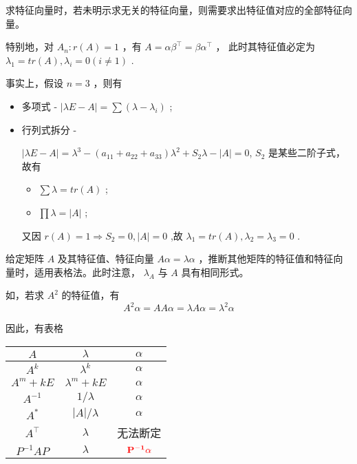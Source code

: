 求特征向量时，若未明示求无关的特征向量，则需要求出特征值对应的全部特征向量。


特别地，对 $ A_n:r(A) = 1 $ ，有 $ A = \alpha\beta^\top = \beta\alpha^\top $ ，
此时其特征值必定为 $ \lambda_1 = tr(A),\lambda_i = 0(i\neq 1) $ .

事实上，假设 $ n = 3 $ ，则有
\begin{itemize}
    \item 多项式 - $ |\lambda E - A | = \sum (\lambda - \lambda_i) $ ;
    \item 行列式拆分 - 
    
    $ |\lambda E - A| = \lambda^3 - (a_{11}+a_{22}+a_{33})\lambda^2 + S_2\lambda - |A| = 0 $,
    $ S_2 $ 是某些二阶子式，
    故有
    \begin{itemize}
        \item $ \sum \lambda = tr(A) $ ;
        \item $ \prod \lambda = |A| $ ;
    \end{itemize}
    又因 $ r(A) = 1 \Rightarrow S_2 = 0, |A| = 0 $ ,故 $ \lambda_1 = tr(A), \lambda_2 = \lambda_3 = 0$ .
\end{itemize} 


给定矩阵 $ A $ 及其特征值、特征向量 $ A\alpha = \lambda\alpha $ ，推断其他矩阵的特征值和特征向量时，适用表格法。此时注意，
$ \lambda_A $ 与 $ A $ 具有相同形式。

如，若求 $ A^2 $ 的特征值，有
$$
    A^2\alpha = AA\alpha = \lambda A\alpha = \lambda^2\alpha
$$ 

因此，有表格

\begin{table}[!htbp]\centering
    \begin{tabular}{ccc}
    \toprule
    $A        $&$ \lambda      $& $\alpha                  $ \\ \midrule
    $A^k      $&$ \lambda^k    $& $\alpha                  $ \\
    $A^m+kE   $&$ \lambda^m+kE $& $\alpha                  $ \\
    $A^{-1}   $&$ 1 /\lambda   $& $\alpha                  $ \\
    $A^*      $&$ |A|/\lambda  $& $\alpha                  $ \\
    $A^\top   $&$ \lambda      $&  无法断定                   \\
    $P^{-1}AP $&$ \lambda      $& $\textcolor{red}{\bf{P^{-1}\alpha}}$ \\ \bottomrule
    \end{tabular}
\end{table}

